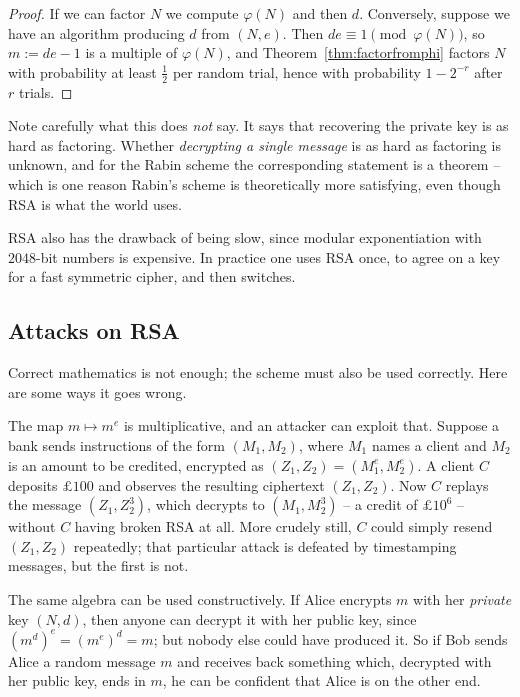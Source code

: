 \begin{proof}
	If we can factor $N$ we compute $\varphi(N)$ and then $d$. Conversely, suppose we have an algorithm producing $d$ from $(N,e)$. Then $de\equiv1\pmod{\varphi(N)}$, so $m := de-1$ is a multiple of $\varphi(N)$, and Theorem~\ref{thm:factorfromphi} factors $N$ with probability at least $\tfrac12$ per random trial, hence with probability $1-2^{-r}$ after $r$ trials.
\end{proof}

\begin{remark}
	Note carefully what this does \emph{not} say. It says that recovering the private key is as hard as factoring. Whether \emph{decrypting a single message} is as hard as factoring is unknown, and for the Rabin scheme the corresponding statement is a theorem -- which is one reason Rabin's scheme is theoretically more satisfying, even though RSA is what the world uses.

	RSA also has the drawback of being slow, since modular exponentiation with $2048$-bit numbers is expensive. In practice one uses RSA once, to agree on a key for a fast symmetric cipher, and then switches.
\end{remark}

\subsection{Attacks on RSA}

Correct mathematics is not enough; the scheme must also be used correctly. Here are some ways it goes wrong.

\begin{example}
	The map $m \mapsto m^e$ is multiplicative, and an attacker can exploit that. Suppose a bank sends instructions of the form $(M_1,M_2)$, where $M_1$ names a client and $M_2$ is an amount to be credited, encrypted as $(Z_1,Z_2) = (M_1^e,M_2^e)$. A client $C$ deposits $\pounds100$ and observes the resulting ciphertext $(Z_1,Z_2)$. Now $C$ replays the message $(Z_1,Z_2^3)$, which decrypts to $(M_1, M_2^3)$ -- a credit of $\pounds10^6$ -- without $C$ having broken RSA at all. More crudely still, $C$ could simply resend $(Z_1,Z_2)$ repeatedly; that particular attack is defeated by timestamping messages, but the first is not.
\end{example}

\begin{example}
	The same algebra can be used constructively. If Alice encrypts $m$ with her \emph{private} key $(N,d)$, then anyone can decrypt it with her public key, since $(m^d)^e = (m^e)^d = m$; but nobody else could have produced it. So if Bob sends Alice a random message $m$ and receives back something which, decrypted with her public key, ends in $m$, he can be confident that Alice is on the other end.
\end{example}

